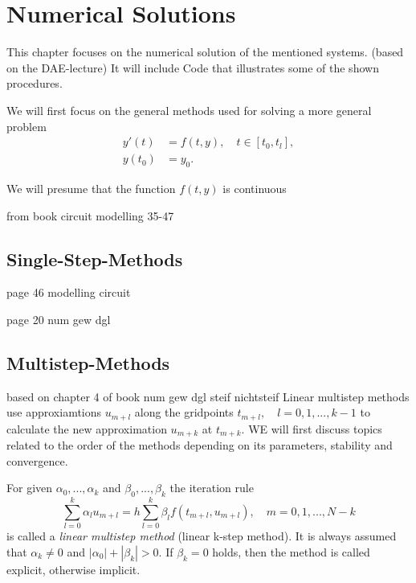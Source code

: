 \section{Numerical Solutions}
This chapter focuses on the numerical solution of the mentioned systems. (based on the DAE-lecture)
It will include Code that illustrates some of the shown procedures.

We will first focus on the general methods used for solving a more general problem
\begin{equation}
	\label{general numerical problem}
	\begin{align}
		y'(t) &= f(t,y), \quad t \in [t_0, t_l], \\
		y(t_0) &= y_0.
	\end{align}
\end{equation}

We will presume that the function $f(t,y)$ is continuous 


from book circuit modelling 35-47

\subsection{Single-Step-Methods}
page 46 modelling circuit

page 20 num gew dgl
\subsection{Multistep-Methods}
based on chapter 4 of book num gew dgl steif nichtsteif \newline
Linear multistep methods use approxiamtions $u_{m+l}$ along the gridpoints $t_{m+l}, \quad l=0,1,...,k-1$ to calculate the new approximation $u_{m+k}$ at $t_{m+k}$. WE will first discuss topics related to the order of the methods depending on its parameters, stability and convergence.

\begin{definition}
	For given $\alpha_0, ..., \alpha_k$ and $\beta_0, ..., \beta_k$ the iteration rule
	\begin{equation}
		\label{linear-multistep-method}
		\sum_{l=0}^{k} \alpha_l u_{m+l} = h \sum_{l=0}^{k} \beta_l f(t_{m+l}, u_{m+l}), \quad m=0,1,...,N-k
	\end{equation}
	is called a \emph{linear multistep method} (linear k-step method). It is always assumed that $\alpha_k \neq 0$ and $|\alpha_0| + |\beta_k| > 0$. If $\beta_k=0$ holds, then the method is called explicit, otherwise implicit.
\end{definition}

